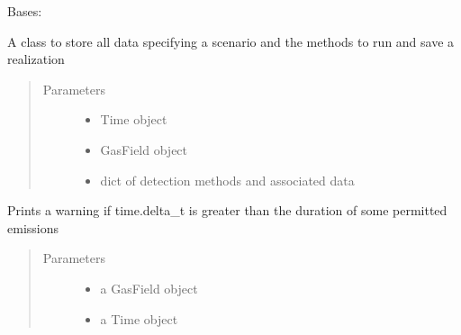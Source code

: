 \documentclass[letterpaper,10pt,english]{sphinxmanual}
\begin{document}
\begin{fulllineitems}
\label{\detokenize{index:feast.EmissionSimModules.simulation_classes.Scenario}}
Bases: 

A class to store all data specifying a scenario and the methods to run and save a realization
\begin{quote}\begin{description}
\item[{Parameters}] \leavevmode\begin{itemize}
\item {} 
 \textendash{} Time object

\item {} 
 \textendash{} GasField object

\item {} 
 \textendash{} dict of detection methods and associated data

\end{itemize}

\end{description}\end{quote}

\begin{fulllineitems}
\label{\detokenize{index:feast.EmissionSimModules.simulation_classes.Scenario.check_timestep}}
Prints a warning if time.delta\_t is greater than the duration of some permitted emissions
\begin{quote}\begin{description}
\item[{Parameters}] \leavevmode\begin{itemize}
\item {} 
 \textendash{} a GasField object

\item {} 
 \textendash{} a Time object

\end{itemize}


\end{description}
\end{quote}
\end{fulllineitems}
\end{fulllineitems}
\end{document}
